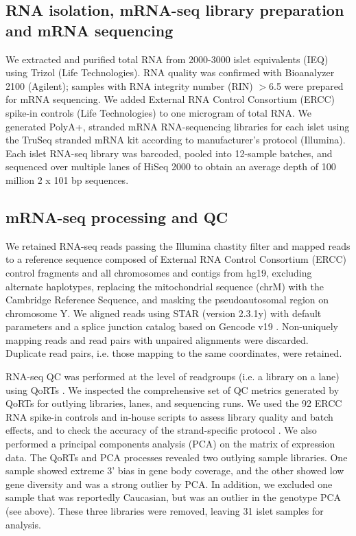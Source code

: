 \subsection{RNA isolation, mRNA-seq library preparation and mRNA sequencing} 
We extracted and purified total RNA from 2000-3000 islet equivalents (IEQ) using Trizol (Life Technologies). RNA quality was confirmed with Bioanalyzer 2100 (Agilent); samples with RNA integrity number (RIN) $>$6.5 were prepared for mRNA sequencing. We added External RNA Control Consortium (ERCC) spike-in controls (Life Technologies) to one microgram of total RNA.  We generated PolyA+, stranded mRNA RNA-sequencing libraries for each islet using the TruSeq stranded mRNA kit according to manufacturer’s protocol (Illumina).  Each islet RNA-seq library was barcoded, pooled into 12-sample batches, and sequenced over multiple lanes of HiSeq 2000 to obtain an average depth of 100 million 2 x 101 bp sequences.

\subsection{mRNA-seq processing and QC}
We retained RNA-seq reads passing the Illumina chastity filter and mapped reads to a reference sequence composed of External RNA Control Consortium (ERCC) control fragments and all chromosomes and contigs from hg19, excluding alternate haplotypes, replacing the mitochondrial sequence (chrM) with the Cambridge Reference Sequence, and masking the pseudoautosomal region on chromosome Y. We aligned reads using STAR (version 2.3.1y) \cite{dobinSTARUltrafastUniversal2013a} with default parameters and a splice junction catalog based on Gencode v19 \cite{harrowGENCODEReferenceHuman2012}. Non-uniquely mapping reads and read pairs with unpaired alignments were discarded. Duplicate read pairs, i.e. those mapping to the same coordinates, were retained. 

RNA-seq QC was performed at the level of readgroups (i.e. a library on a lane) using QoRTs \cite{hartleyQoRTsComprehensiveToolset2015a}. We inspected the comprehensive set of QC metrics generated by QoRTs for outlying libraries, lanes, and sequencing runs. We used the 92 ERCC RNA spike-in controls and in-house scripts to assess library quality and batch effects, and to check the accuracy of the strand-specific protocol \cite{jiangSyntheticSpikeinStandards2011}. We also performed a principal components analysis (PCA) on the matrix of expression data. The QoRTs and PCA processes revealed two outlying sample libraries.  One sample showed extreme 3’ bias in gene body coverage, and the other showed low gene diversity and was a strong outlier by PCA. In addition, we excluded one sample that was reportedly Caucasian, but was an outlier in the genotype PCA (see above). These three libraries were removed, leaving 31 islet samples for analysis.

